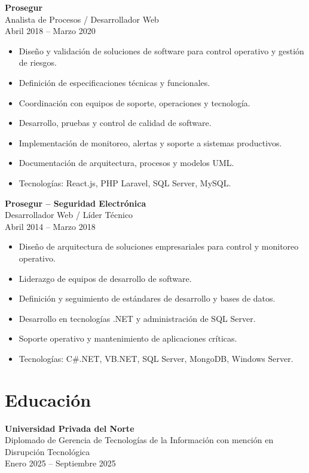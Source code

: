 \documentclass[11pt,a4paper]{article}
\begin{document}
\textbf{Prosegur} \\
Analista de Procesos / Desarrollador Web \\
Abril 2018 – Marzo 2020
\begin{itemize}[leftmargin=*]
\item Diseño y validación de soluciones de software para control operativo y gestión de riesgos.
\item Definición de especificaciones técnicas y funcionales.
\item Coordinación con equipos de soporte, operaciones y tecnología.
\item Desarrollo, pruebas y control de calidad de software.
\item Implementación de monitoreo, alertas y soporte a sistemas productivos.
\item Documentación de arquitectura, procesos y modelos UML.
\item Tecnologías: React.js, PHP Laravel, SQL Server, MySQL.
\end{itemize}

\textbf{Prosegur – Seguridad Electrónica} \\
Desarrollador Web / Líder Técnico \\
Abril 2014 – Marzo 2018
\begin{itemize}[leftmargin=*]
\item Diseño de arquitectura de soluciones empresariales para control y monitoreo operativo.
\item Liderazgo de equipos de desarrollo de software.
\item Definición y seguimiento de estándares de desarrollo y bases de datos.
\item Desarrollo en tecnologías .NET y administración de SQL Server.
\item Soporte operativo y mantenimiento de aplicaciones críticas.
\item Tecnologías: C\#.NET, VB.NET, SQL Server, MongoDB, Windows Server.
\end{itemize}

\section*{Educación}

\textbf{Universidad Privada del Norte} \\
Diplomado de Gerencia de Tecnologías de la Información con mención en Disrupción Tecnológica \\
Enero 2025 – Septiembre 2025
\end{document}

